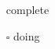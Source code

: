 \documentclass[10pt]{article}
\begin{document}
\begin{itemize}
\item [\checkmark] complete
\item [$\square$] doing
\end{itemize}
\end{document}
